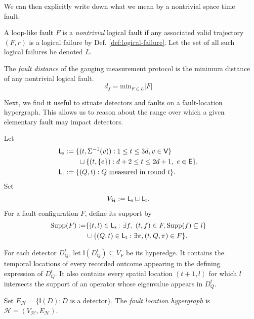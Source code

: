 \documentclass[11pt]{article}
\begin{document}
We can then explicitly write down what we mean by a nontrivial space time fault:
\begin{definition}
\label{def:fault-distance}
    A loop-like fault $F$ is a \emph{nontrivial} logical fault if any associated valid trajectory $(F, r)$ is a logical failure by Def. \ref{def:logical-failure}. Let the set of all such logical failures be denoted $L$.

    The \emph{fault distance} of the gauging measurement protocol is the minimum distance of any nontrivial logical fault.
    \[
    d_f = \text{min}_{F \in L} |F|
    \]
\end{definition}

Next, we find it useful to situate detectors and faults on a fault-location hypergraph. This allows us to reason about the range over which a given elementary fault may impact detectors.

\begin{definition}
\label{def:fault-location-hypergraph}
    Let
    \begin{align}
        \mathsf{L}_{\mathrm{s}}&:=\{(t,\vertexset{v}):1\le t\le 3d,v\in\vertexV\}\\
        &\qquad \sqcup \{(t,\{e\}):d+2\le t\le 2d+1,\ e\in\edgeE\},\notag\\
        \mathsf{L}_\mathrm{t}&:=\{(Q,t): Q\text{ measured in round }t\}.
\end{align}
Set 
\begin{align}
    V_\mathcal{H}:= \mathsf{L}_{\rm{s}} \sqcup \mathsf{L}_{\rm{t}}.\notag
\end{align}
    For a fault configuration $F$, define its support by
    \begin{align}
        \supp{F}:=&\{(t,l)\in \mathsf{L}_{\rm{s}}:\exists f,\ (t,f)\in F, \supp{f}\subseteq l\}\notag\\
        &\cup \{ (Q,t) \in \mathsf{L}_\mathrm{t}: \exists\pi, (t,Q,\pi)\in F\}.\notag
    \end{align}
    
    For each detector $D^t_Q$, let $\mathsf{I}(D^t_Q)\subseteq V_F$ be its hyperedge. It contains the temporal locations of every recorded outcome appearing in the defining expression of $D^t_{Q}$. It also contains every spatial location $(t+1,l)$ for which $l$ intersects the support of an operator whose eigenvalue appears in $D^t_Q$. 
    
    Set 
    $E_\mathcal{H}=\{\mathsf{I}(D): D\text{ is a detector}\}$.
    The \emph{fault location hypergraph} is $\mathcal{H}=(V_\mathcal{H}, E_\mathcal{H})$. 
\end{definition}
\end{document}
